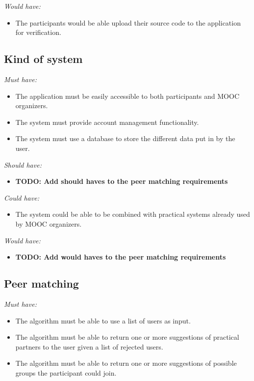 \documentclass[]{article}
\newcommand{\TODO}[1]{{\color{red}\textbf{TODO: #1}}}
\newcommand{\reqr}[1]{{\noindent\emph{#1:}}}
\begin{document}
\reqr{Would have}
\begin{itemize}
\item The participants would be able upload their source code to the application for verification.
\end{itemize}

\subsection{Kind of system}

\reqr{Must have}
\begin{itemize}
\item The application must be easily accessible to both participants and MOOC organizers.
\item The system must provide account management functionality.
\item The system must use a database to store the different data put in by the user.
\end{itemize}

\reqr{Should have}
\begin{itemize}
\item \TODO{Add should haves to the peer matching requirements}
\end{itemize}

\reqr{Could have}
\begin{itemize}
\item The system could be able to be combined with practical systems already used by MOOC organizers.
\end{itemize}

\reqr{Would have}
\begin{itemize}
\item \TODO{Add would haves to the peer matching requirements}
\end{itemize}

\subsection{Peer matching}
\reqr{Must have}
\begin{itemize}
\item The algorithm must be able to use a list of users as input.
\item The algorithm must be able to return one or more suggestions of practical partners to the user given a list of rejected users.
\item The algorithm must be able to return one or more suggestions of possible groups the participant could join.
\end{itemize}
\end{document}
